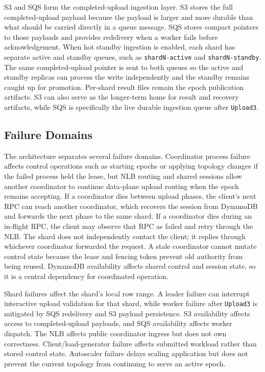 \documentclass[conference]{IEEEtran}
\begin{document}
S3 and SQS form the completed-upload ingestion layer. S3 stores the full completed-upload payload because the payload is larger and more durable than what should be carried directly in a queue message. SQS stores compact pointers to those payloads and provides redelivery when a worker fails before acknowledgement. When hot standby ingestion is enabled, each shard has separate active and standby queues, such as \texttt{shardN-active} and \texttt{shardN-standby}. The same completed-upload pointer is sent to both queues so the active and standby replicas can process the write independently and the standby remains caught up for promotion. Per-shard result files remain the epoch publication artifacts. S3 can also serve as the longer-term home for result and recovery artifacts, while SQS is specifically the live durable ingestion queue after \texttt{Upload3}.

\subsection{Failure Domains}

The architecture separates several failure domains. Coordinator process failure affects control operations such as starting epochs or applying topology changes if the failed process held the lease, but NLB routing and shared sessions allow another coordinator to continue data-plane upload routing when the epoch remains accepting. If a coordinator dies between upload phases, the client's next RPC can reach another coordinator, which recovers the session from DynamoDB and forwards the next phase to the same shard. If a coordinator dies during an in-flight RPC, the client may observe that RPC as failed and retry through the NLB. The shard does not independently contact the client; it replies through whichever coordinator forwarded the request. A stale coordinator cannot mutate control state because the lease and fencing token prevent old authority from being reused. DynamoDB availability affects shared control and session state, so it is a central dependency for coordinated operation.

Shard failures affect the shard's local row range. A leader failure can interrupt interactive upload validation for that shard, while worker failure after \texttt{Upload3} is mitigated by SQS redelivery and S3 payload persistence. S3 availability affects access to completed-upload payloads, and SQS availability affects worker dispatch. The NLB affects public coordinator ingress but does not own correctness. Client/load-generator failure affects submitted workload rather than stored control state. Autoscaler failure delays scaling application but does not prevent the current topology from continuing to serve an active epoch.
\end{document}
